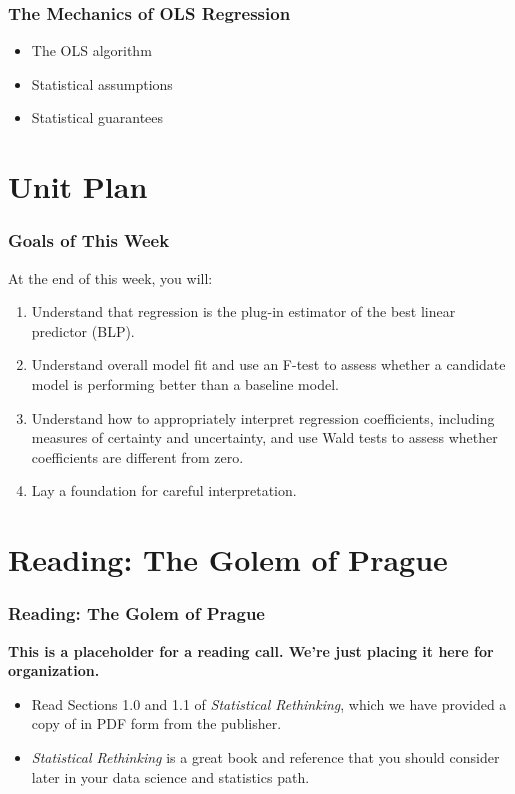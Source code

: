 \documentclass[12pt, block=fill]{beamer}
\begin{document}
\begin{frame}
  \frametitle{The Mechanics of OLS Regression}
  
  \begin{itemize}
\item The OLS algorithm
\item Statistical assumptions
\item Statistical guarantees
\end{itemize}
\end{frame}

\section{Unit Plan}

\begin{frame}
  \frametitle{Goals of This Week}
  At the end of this week, you will: 
  \begin{enumerate}
  \item Understand that regression is the plug-in estimator
    of the best linear predictor (BLP). 
  \item Understand overall model fit and use an F-test to assess
    whether a candidate model is performing better than a baseline
    model.
  \item Understand how to appropriately interpret regression
    coefficients, including measures of certainty and uncertainty, and
    use Wald tests to assess whether coefficients are different from zero.
  \item Lay a foundation for careful interpretation. 
  \end{enumerate}

\end{frame}

\section{Reading: The Golem of Prague}

\begin{frame}
  \frametitle{Reading: The Golem of Prague}
  \textbf{This is a placeholder for a reading call. We're just placing
    it here for organization.} 
  \begin{itemize}
  \item Read Sections 1.0 and 1.1 of \textit{Statistical Rethinking},
    which we have provided a copy of in PDF form from the publisher.
  \item \textit{Statistical Rethinking} is a great book and reference
    that you should consider later in your data science and statistics
    path.
  \end{itemize}
\end{frame}
\end{document}
